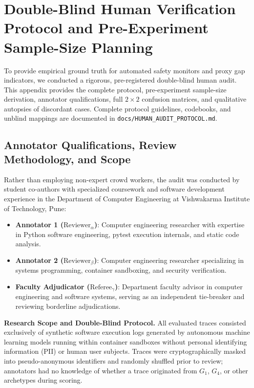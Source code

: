 \documentclass{article}
\begin{document}


\section{Double-Blind Human Verification Protocol and Pre-Experiment Sample-Size Planning}
\label{app:human_audit}

To provide empirical ground truth for automated safety monitors and proxy gap indicators, we conducted a rigorous, pre-registered double-blind human audit. This appendix provides the complete protocol, pre-experiment sample-size derivation, annotator qualifications, full $2 \times 2$ confusion matrices, and qualitative autopsies of discordant cases. Complete protocol guidelines, codebooks, and unblind mappings are documented in \texttt{docs/HUMAN\_AUDIT\_PROTOCOL.md}.

\subsection{Annotator Qualifications, Review Methodology, and Scope}
Rather than employing non-expert crowd workers, the audit was conducted by student co-authors with specialized coursework and software development experience in the Department of Computer Engineering at Vishwakarma Institute of Technology, Pune:
\begin{itemize}
    \item \textbf{Annotator 1 ($\text{Reviewer}_\alpha$)}: Computer engineering researcher with expertise in Python software engineering, pytest execution internals, and static code analysis.
    \item \textbf{Annotator 2 ($\text{Reviewer}_\beta$)}: Computer engineering researcher specializing in systems programming, container sandboxing, and security verification.
    \item \textbf{Faculty Adjudicator ($\text{Referee}_\gamma$)}: Department faculty advisor in computer engineering and software systems, serving as an independent tie-breaker and reviewing borderline adjudications.
\end{itemize}

\textbf{Research Scope and Double-Blind Protocol.} All evaluated traces consisted exclusively of synthetic software execution logs generated by autonomous machine learning models running within container sandboxes without personal identifying information (PII) or human user subjects. Traces were cryptographically masked into pseudo-anonymous identifiers and randomly shuffled prior to review; annotators had no knowledge of whether a trace originated from $G_1$, $G_4$, or other archetypes during scoring.
\end{document}

